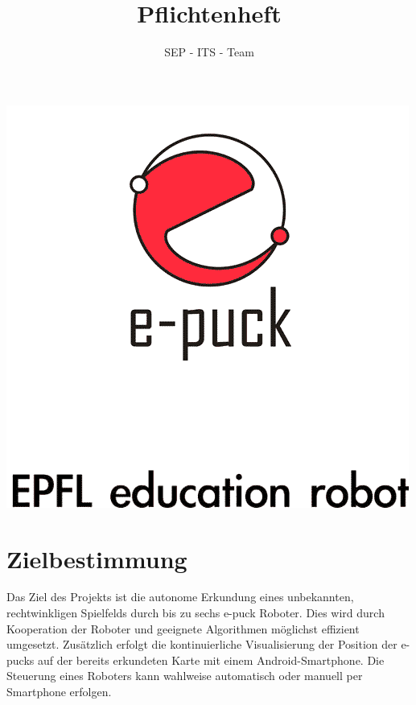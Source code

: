 \documentclass[10pt,a4paper]{article}
\author{SEP - ITS - Team}
\title{Pflichtenheft}
\begin{document}
	\maketitle
	\includegraphics[scale=0.5, origin=c]{logo.png}
	\newpage
	\section{Zielbestimmung}
		Das Ziel des Projekts ist die autonome Erkundung eines unbekannten, rechtwinkligen Spielfelds durch bis zu
		sechs e-puck Roboter. Dies wird durch Kooperation der Roboter und geeignete Algorithmen möglichst
		effizient umgesetzt.
		Zusätzlich erfolgt die kontinuierliche Visualisierung der Position der e-pucks auf der
		bereits erkundeten Karte mit einem Android-Smartphone.
		Die Steuerung eines Roboters kann wahlweise automatisch oder manuell per Smartphone erfolgen.
\end{document}

